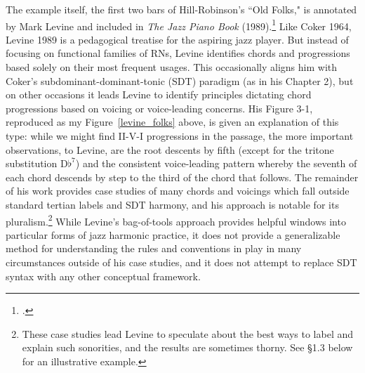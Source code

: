 The example itself, the first two bars of Hill-Robinson's ``Old Folks," is annotated by Mark Levine and included in \emph{The Jazz Piano Book} (1989).\footnote{\cite{levine1989}.}  Like Coker 1964, Levine 1989 is a pedagogical treatise for the aspiring jazz player.  But instead of focusing on functional families of RNs, Levine identifies chords and progressions based solely on their most frequent usages.  This occasionally aligns him with Coker's subdominant-dominant-tonic (SDT) paradigm (as in his Chapter 2), but on other occasions it leads Levine to identify principles dictating chord progressions based on voicing or voice-leading concerns.  His Figure 3-1, reproduced as my Figure~\ref{levine_folks} above, is given an explanation of this type: while we might find II-V-I progressions in the passage, the more important observations, to Levine, are the root descents by fifth (except for the tritone substitution D$\flat^7$) and the consistent voice-leading pattern whereby the seventh of each chord descends by step to the third of the chord that follows.  The remainder of his work provides case studies of many chords and voicings which fall outside standard tertian labels and SDT harmony, and his approach is notable for its pluralism.\footnote{These case studies lead Levine to speculate about the best ways to label and explain such sonorities, and the results are sometimes thorny.  See \S 1.3 below for an illustrative example.}  While Levine's bag-of-tools approach provides helpful windows into particular forms of jazz harmonic practice, it does not provide a generalizable method for understanding the rules and conventions in play in many circumstances outside of his case studies, and it does not attempt to replace SDT syntax with any other conceptual framework.

